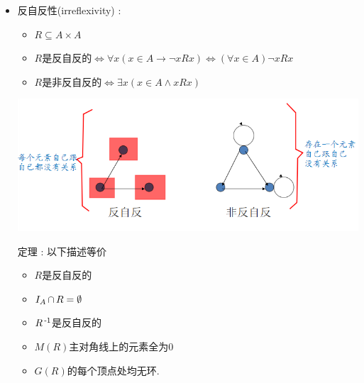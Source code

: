 {{{{\begin{itemize}
{            定理 : 以下描述等价
            \begin{itemize}
              \item $R$是自反的
              \item $I_A \subseteq R$
              \item $R\inverse$是自反的
              \item $M(R)$主对角线上的元素全为$1$
              \item $G(R)$的每个顶点处均有环.
            \end{itemize}
            }
      \item {
            反自反性(irreflexivity) : \begin{itemize}
              \item $R \subseteq A \times A$
              \item $R$是反自反的$\Leftrightarrow \forall x(x \in A \to \lnot xRx) \Leftrightarrow (\forall x \in A)\lnot xRx$
              \item $R$是非反自反的$\Leftrightarrow \exists x(x \in A \land xRx)$
            \end{itemize}

            \begin{center}
              \includegraphics{resources/irreflexivity.png}
            \end{center}

            定理 : 以下描述等价
            \begin{itemize}
              \item $R$是反自反的
              \item $I_A \operatorname{\cap} R = \emptyset$
              \item $R\inverse$是反自反的
              \item $M(R)$主对角线上的元素全为0
              \item $G(R)$的每个顶点处均无环.
            \end{itemize}

}
\end{itemize}}}}}
